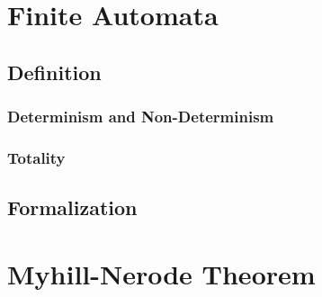 \documentclass[11pt,a4paper,oneside]{book}
\begin{document}
        \section{Finite Automata}

            \paragraph{} 

            \subsection{Definition}

                \paragraph{}

                \subsubsection{Determinism and Non-Determinism}

                    \paragraph{}

                \subsubsection{Totality}

                    \paragraph{}

            
            \subsection{Formalization}

                \paragraph{}

        \section{Myhill-Nerode Theorem}
\end{document}
